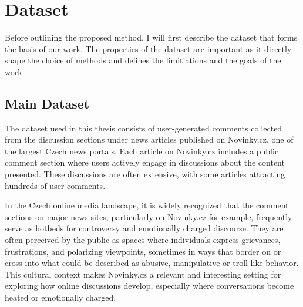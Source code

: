 \documentclass[twoside]{ctuthesis}
\theoremstyle{plain}
\theoremstyle{definition}
\theoremstyle{note}
\begin{document}


\chapter{Dataset}

Before outlining the proposed method, I will first describe the dataset that forms the basis of our work. The properties of the dataset are important as it directly shape the choice of methods and defines the limitiations and the goals of the work. \par

\section{Main Dataset}
The dataset used in this thesis consists of user-generated comments collected from the discussion sections under news articles published on Novinky.cz, one of the largest Czech news portals. Each article on Novinky.cz includes a public comment section where users actively engage in discussions about the content presented. These discussions are often extensive, with some articles attracting hundreds of user comments.\par

In the Czech online media landscape, it is widely recognized that the comment sections on major news sites, particularly on Novinky.cz for example, frequently serve as hotbeds for controversy and emotionally charged discourse. They are often perceived by the public as spaces where individuals express grievances, frustrations, and polarizing viewpoints, sometimes in ways that border on or cross into what could be described as abusive, manipulative or troll like behavior. This cultural context makes Novinky.cz a relevant and interesting setting for exploring how online discussions develop, especially where conversations become heated or emotionally charged.\par
\end{document}
